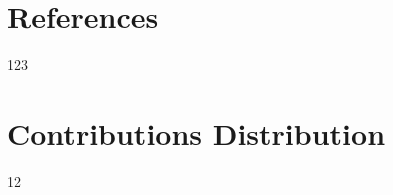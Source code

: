 \documentclass{article}
\newcommand\footurl[1]{\footnote{\url{#1}}}
\newcommand\urllink[2]{#1\footurl{#2}}
\begin{document}
\section{References}
123


\section{Contributions Distribution}
12








\end{document}

